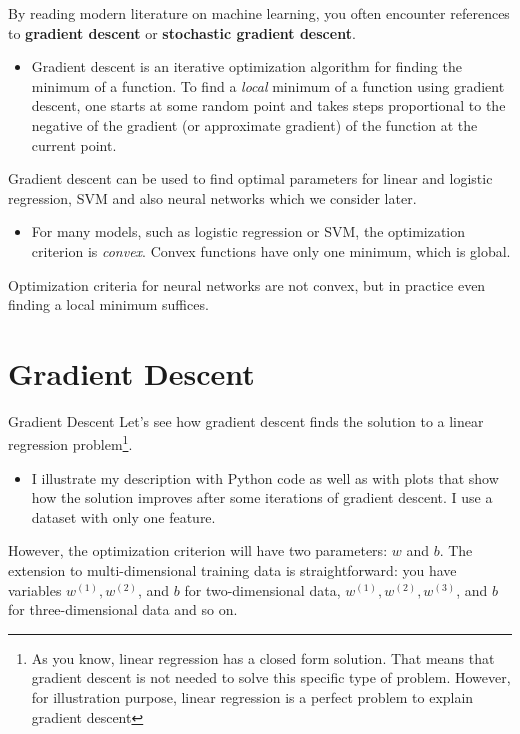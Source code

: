 \documentclass[9pt,dvipsnames]{beamer}
\begin{document}
\begin{frame}
	By reading modern literature on machine learning, you often encounter references to \textbf{gradient descent} or \textbf{stochastic gradient descent}. 
	\begin{itemize}
		\item Gradient descent is an iterative optimization algorithm for finding the minimum of a function. To find a \textit{local} minimum of a function using gradient descent, one starts at some random point and takes steps proportional to the negative of the gradient (or approximate gradient) of the function at the current point.
	\end{itemize}
	Gradient descent can be used to find optimal parameters for linear and logistic regression, SVM and also neural networks which we consider later.
	\begin{itemize}
		\item For many models, such as logistic regression or SVM, the optimization criterion is \textit{convex}. Convex functions have only one minimum, which is global.
	\end{itemize}
	  Optimization criteria for neural networks are not convex, but in practice even finding a local minimum suffices.
\end{frame}

\section{Gradient Descent}
\begin{frame}{Gradient Descent}
	Let's see how gradient descent finds the solution to a linear regression problem\footnote{As you know, linear regression has a closed form solution. That means that gradient descent is not needed to solve this specific type of problem. However, for illustration purpose, linear regression is a perfect problem to explain gradient descent}.  
	\begin{itemize}
		\item I illustrate my description with Python code as well as with plots that show how the solution improves after some iterations of gradient descent. I use a dataset with only one feature.
	\end{itemize}
	  However, the optimization criterion will have two parameters: $w$ and $b$. The extension to multi-dimensional training data is straightforward: you have variables $w^{(1)}, w^{(2)}$, and $b$ for two-dimensional data, $w^{(1)}, w^{(2)}, w^{(3)}$, and $b$ for three-dimensional data and so on.
\end{frame}
\end{document}
